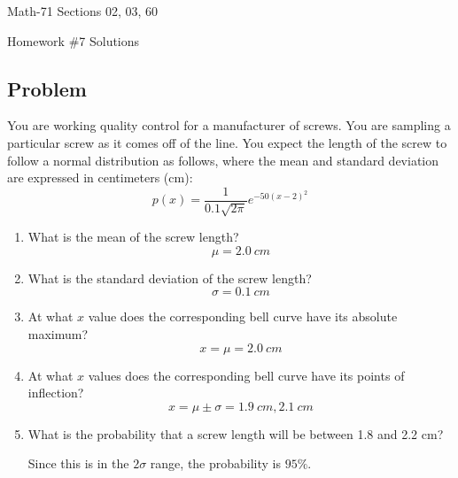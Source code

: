 \documentclass[letterpaper,12pt,fleqn]{article}
\newcommand{\m}{\mu}
\renewcommand{\o}{\sigma}
\begin{document}
\begin{center}
  \large
  Math-71 Sections 02, 03, 60

  \Large
  Homework \#7 Solutions
\end{center}

\subsection*{Problem}

You are working quality control for a manufacturer of screws.  You are sampling a particular screw as it comes off
of the line.  You expect the length of the screw to follow a normal distribution as follows, where the mean and
standard deviation are expressed in centimeters (cm):
\[p(x)=\frac{1}{0.1\sqrt{2\pi}}e^{-50(x-2)^2}\]
\begin{enumerate}
\item What is the mean of the screw length?
  \[\m=\SI{2.0}{cm}\]
\item What is the standard deviation of the screw length?
  \[\o=\SI{0.1}{cm}\]
\item At what \(x\) value does the corresponding bell curve have its absolute maximum?
  \[x=\mu=\SI{2.0}{cm}\]
\item At what \(x\) values does the corresponding bell curve have its points of inflection?
  \[x=\mu\pm\o=\SI{1.9}{cm},\SI{2.1}{cm}\]
\item What is the probability that a screw length will be between 1.8 and 2.2 cm?

  Since this is in the \(2\o\) range, the probability is \(95\%\).
\end{enumerate}
\end{document}
